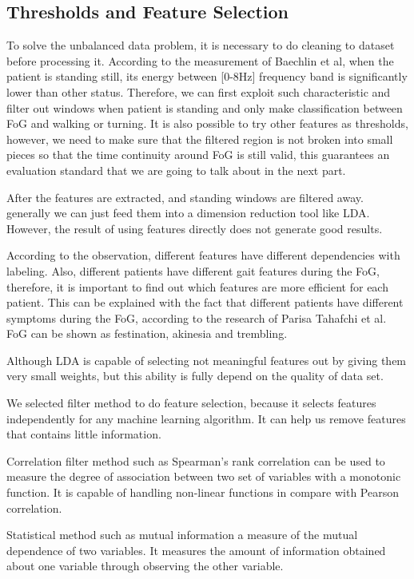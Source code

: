 \documentclass[article]{article}
\begin{document}
\subsection{ Thresholds and Feature Selection}

To solve the unbalanced data problem, it is necessary to do cleaning to dataset before processing it. According to the measurement of Baechlin et al, when the patient is standing still, its energy between [0-8Hz] frequency band is significantly lower than other status. Therefore, we can first exploit such characteristic and filter out windows when patient is standing and only make classification between FoG and walking or turning. It is also possible to try other features as thresholds, however, we need to make sure that the filtered region is not broken into small pieces so that the time continuity around FoG is still valid, this guarantees an evaluation standard that we are going to talk about in the next part.

After the features are extracted, and standing windows are filtered away. generally we can just feed them into a dimension reduction tool like LDA. However, the result of using features directly does not generate good results.

According to the observation, different features have different dependencies with labeling. Also, different patients have different gait features during the FoG, therefore, it is important to find out which features are more efficient for each patient. This can be explained with the fact that different patients have different symptoms during the FoG, according to the research of Parisa Tahafchi et al.\cite{symptoms} FoG can be shown as festination, akinesia and trembling.

Although LDA is capable of selecting not meaningful features out by giving them very small weights, but this ability is fully depend on the quality of data set.

We selected filter method to do feature selection, because it selects features independently for any machine learning algorithm. It can help us remove features that contains little information.

Correlation filter method such as Spearman's rank correlation can be used to measure the degree of association between two set of variables with a monotonic function. It is capable of handling non-linear functions in compare with Pearson correlation.

Statistical method such as mutual information a measure of the mutual dependence of two variables. It measures the amount of information obtained about one variable through observing the other variable. 
\end{document}

